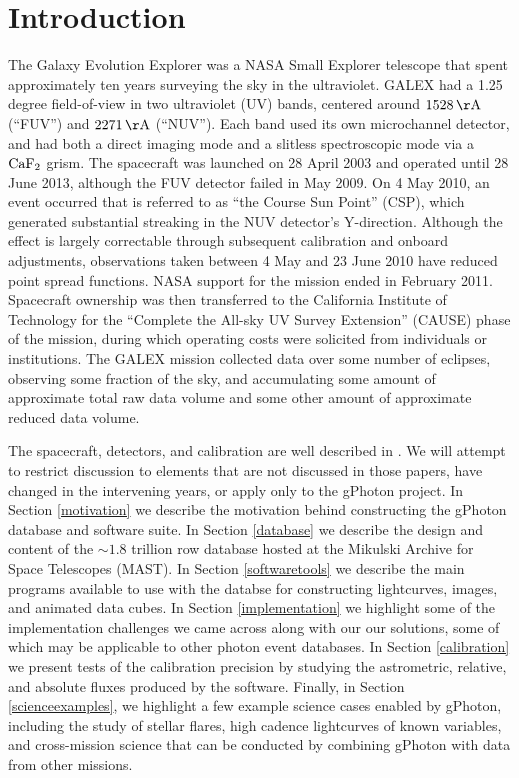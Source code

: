 \documentclass[preprint]{aastex}
\begin{document}
\section{Introduction}
The Galaxy Evolution Explorer \citep[GALEX;][]{mar2005} was a NASA Small Explorer telescope that spent approximately ten years surveying the sky in the ultraviolet. GALEX had a 1.25 degree field-of-view in two ultraviolet (UV) bands, centered around $1528\,\rm{\AA}$ (“FUV”) and $2271\,\rm{\AA}$ (“NUV”). Each band used its own microchannel detector, and had both a direct imaging mode and a slitless spectroscopic mode via a $\rm{CaF_{2}}$ grism. The spacecraft was launched on 28 April 2003 and operated until 28 June 2013, although the FUV detector failed in May 2009. On 4 May 2010, an event occurred that is referred to as ``the Course Sun Point'' (CSP), which generated substantial streaking in the NUV detector's Y-direction. Although the effect is largely correctable through subsequent calibration and onboard adjustments, observations taken between 4 May and 23 June 2010 have reduced point spread functions. NASA support for the mission ended in February 2011. Spacecraft ownership was then transferred to the California Institute of Technology for the “Complete the All-sky UV Survey Extension” (CAUSE) phase of the mission, during which operating costs were solicited from individuals or institutions. The GALEX mission collected data over {\color{red}some number of eclipses}, observing {\color{red}some fraction of the sky}, and accumulating {\color{red}some amount of} approximate total raw data volume and {\color{red}some other amount of} approximate reduced data volume.

The spacecraft, detectors, and calibration are well described in \citet{mor2005,mor2007}. We will attempt to restrict discussion to elements that are not discussed in those papers, have changed in the intervening years, or apply only to the gPhoton project. In Section \ref{motivation} we describe the motivation behind constructing the gPhoton database and software suite. In Section \ref{database} we describe the design and content of the $\sim 1.8$ trillion row database hosted at the Mikulski Archive for Space Telescopes (MAST). In Section \ref{softwaretools} we describe the main programs available to use with the databse for constructing lightcurves, images, and animated data cubes.  In Section \ref{implementation} we highlight some of the implementation challenges we came across along with our our solutions, some of which may be applicable to other photon event databases. In Section \ref{calibration} we present tests of the calibration precision by studying the astrometric, relative, and absolute fluxes produced by the software.  Finally, in Section \ref{scienceexamples}, we highlight a few example science cases enabled by gPhoton, including the study of stellar flares, high cadence lightcurves of known variables, and cross-mission science that can be conducted by combining gPhoton with data from other missions.
\end{document}
